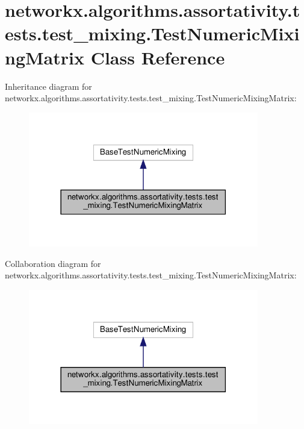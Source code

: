 \hypertarget{classnetworkx_1_1algorithms_1_1assortativity_1_1tests_1_1test__mixing_1_1TestNumericMixingMatrix}{}\section{networkx.\+algorithms.\+assortativity.\+tests.\+test\+\_\+mixing.\+Test\+Numeric\+Mixing\+Matrix Class Reference}
\label{classnetworkx_1_1algorithms_1_1assortativity_1_1tests_1_1test__mixing_1_1TestNumericMixingMatrix}


Inheritance diagram for networkx.\+algorithms.\+assortativity.\+tests.\+test\+\_\+mixing.\+Test\+Numeric\+Mixing\+Matrix\+:
\nopagebreak
\begin{figure}[H]
\begin{center}
\leavevmode
\includegraphics[width=285pt]{classnetworkx_1_1algorithms_1_1assortativity_1_1tests_1_1test__mixing_1_1TestNumericMixingMatrix__inherit__graph}
\end{center}
\end{figure}


Collaboration diagram for networkx.\+algorithms.\+assortativity.\+tests.\+test\+\_\+mixing.\+Test\+Numeric\+Mixing\+Matrix\+:
\nopagebreak
\begin{figure}[H]
\begin{center}
\leavevmode
\includegraphics[width=285pt]{classnetworkx_1_1algorithms_1_1assortativity_1_1tests_1_1test__mixing_1_1TestNumericMixingMatrix__coll__graph}
\end{center}
\end{figure}

